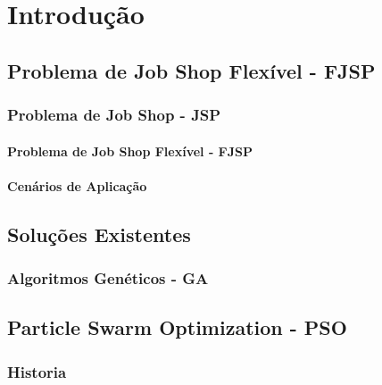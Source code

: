 \chapter{Introdução}
\lipsum[2]

\section{Problema de Job Shop Flexível - FJSP}
\lipsum[2]

\subsection{Problema de Job Shop - JSP} 
\lipsum[2]

\subsubsection{Problema de Job Shop Flexível - FJSP}
\lipsum[3]

\subsubsection{Cenários de Aplicação}
\lipsum[3]

\section{Soluções Existentes}
\lipsum[3]

\subsection{Algoritmos Genéticos - GA}
\lipsum[2]



\section{Particle Swarm Optimization - PSO}
\lipsum[4]

\subsection{Historia}
\lipsum[2]

